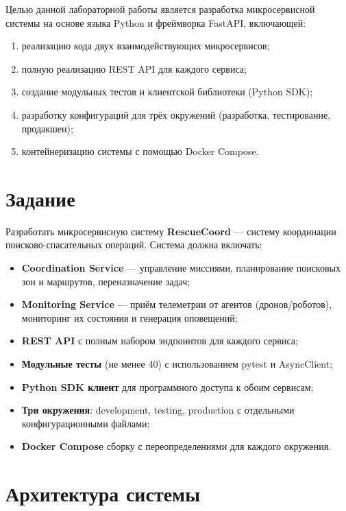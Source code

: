 \documentclass[12pt,a4paper]{article}
\begin{document}
Целью данной лабораторной работы является разработка микросервисной системы на
основе языка Python и фреймворка FastAPI, включающей:
\begin{enumerate}[label=\arabic*.]
    \item реализацию кода двух взаимодействующих микросервисов;
    \item полную реализацию REST API для каждого сервиса;
    \item создание модульных тестов и клиентской библиотеки (Python SDK);
    \item разработку конфигураций для трёх окружений (разработка, тестирование, продакшен);
    \item контейнеризацию системы с помощью Docker Compose.
\end{enumerate}

\section{Задание}

Разработать микросервисную систему \textbf{RescueCoord} --- систему координации
поисково-спасательных операций. Система должна включать:

\begin{itemize}
    \item \textbf{Coordination Service} --- управление миссиями, планирование
          поисковых зон и маршрутов, переназначение задач;
    \item \textbf{Monitoring Service} --- приём телеметрии от агентов (дронов/роботов),
          мониторинг их состояния и генерация оповещений;
    \item \textbf{REST API} с полным набором эндпоинтов для каждого сервиса;
    \item \textbf{Модульные тесты} (не менее 40) с использованием pytest и AsyncClient;
    \item \textbf{Python SDK клиент} для программного доступа к обоим сервисам;
    \item \textbf{Три окружения}: development, testing, production с отдельными
          конфигурационными файлами;
    \item \textbf{Docker Compose} сборку с переопределениями для каждого окружения.
\end{itemize}

\section{Архитектура системы}
\end{document}
